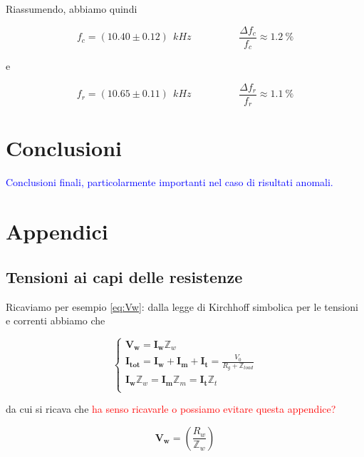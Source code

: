 \documentclass[12pt,italian]{article}
\newcommand{\prof}[1]{\textcolor{blue}{#1}}
\newcommand{\err}[1]{\textcolor{red}{#1}}
\begin{document}
Riassumendo, abbiamo quindi

\begin{equation*}
	f_{c} = (10.40 \pm 0.12)\  \ kHz \hspace{2cm} \frac{\Delta f_{c}}{f_{c}} \approx 1.2 \ \%
\end{equation*}

\noindent
e

\begin{equation*}
	f_{r} = (10.65 \pm 0.11)\  \ kHz \hspace{2cm} \frac{\Delta f_{r}}{f_{r}} \approx 1.1 \ \%
\end{equation*}

\section*{Conclusioni}
\prof{Conclusioni finali, particolarmente importanti nel caso di risultati
	anomali.}

\appendix
\section{Appendici}
\subsection{Tensioni ai capi delle resistenze}
\label{sec:tensioni}

Ricaviamo per esempio \eqref{eq:Vw}: dalla legge di Kirchhoff simbolica per le
tensioni e correnti abbiamo che

\begin{equation}
	\begin{cases}
		\mathbf{V_{w}} = \mathbf{I_{w}} \mathbb{Z}_{w}                                                                \\
		\mathbf{I_{tot}} = \mathbf{I_{w}} + \mathbf{I_{m}} + \mathbf{I_{t}} = \frac{V_{0}}{R_{g} + \mathbb{Z}_{load}} \\
		\mathbf{I_{w}} \mathbb{Z}_{w} = \mathbf{I_{m}} \mathbb{Z}_{m} = \mathbf{I_{t}} \mathbb{Z}_{t}                 \\
	\end{cases}
\end{equation}

\noindent
da cui si ricava che \err{ha senso ricavarle o possiamo evitare questa appendice?}

\begin{equation}
	\mathbf{V_{w}} = \left( \frac{R_{w}}{\mathbb{Z}_{w}} \right)
\end{equation}
\end{document}

